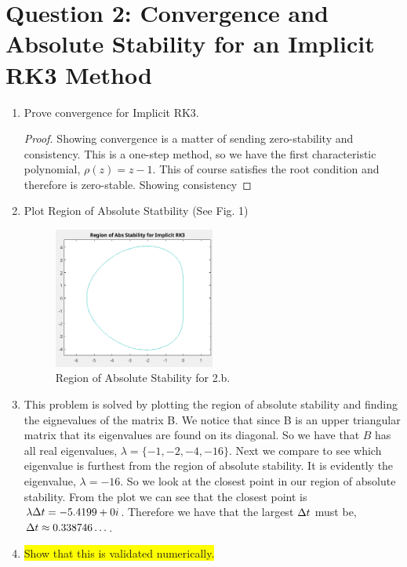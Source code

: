 \documentclass{article}
\begin{document}
\section*{Question 2: Convergence and Absolute Stability for an Implicit RK3
Method}

\begin{enumerate}[label=\alph*)]

    \item Prove convergence for Implicit RK3.
    \begin{proof}
        Showing convergence is a matter of sending zero-stability and
        consistency. This is a one-step method, so we have the first
        characteristic polynomial, $\rho(z) = z - 1$. This of course satisfies
        the root condition and therefore is zero-stable. Showing consistency 
    \end{proof}

    \item Plot Region of Absolute Statbility (See Fig. 1)
    \begin{figure}[ht]
        \centering 
        \includegraphics[width=0.5\textwidth]{2.b.AbsStab'.png}
        \caption{Region of Absolute Stability for 2.b.}
    \end{figure}

    \item  
    This problem is solved by plotting the region of absolute stability and
    finding the eignevalues of the matrix B. We notice that since B is an upper
    triangular matrix that its eigenvalues are found on its diagonal. So we have
    that $B$ has all real eigenvalues, $\lambda = \{-1, -2, -4, -16\}$. Next we
    compare to see which eigenvalue is furthest from the region of absolute
    stability. It is evidently the eigenvalue, $\lambda = -16$. So we look at
    the closest point in our region of absolute stability. From the plot we can
    see that the closest point is $\lambda\Delta t = -5.4199 + 0i$. Therefore we
    have that the largest $\Delta t$ must be, $\Delta t \approx 0.338746\ldots$. 

    \item \colorbox{yellow}{Show that this is validated numerically. }

\end{enumerate}
\end{document}
